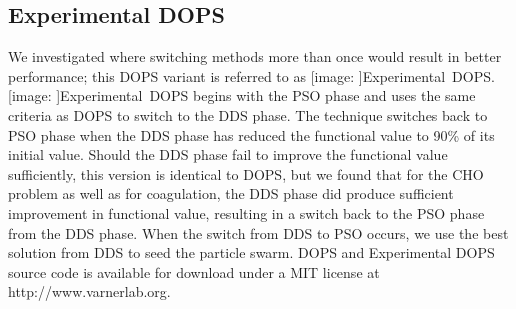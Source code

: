 \documentclass{bmcart}
\def\texttt{[image: ]}
\begin{document}
\subsection*{Experimental DOPS}
We investigated where switching methods more than once would result in better performance; this DOPS variant is referred to as \texttt{Experimental~DOPS}.
\texttt{Experimental~DOPS} begins with the PSO phase and uses the same criteria as DOPS to switch to the DDS phase. The technique switches back to PSO phase when the DDS phase has reduced the functional value to 90\% of its initial value.
Should the DDS phase fail to improve the functional value sufficiently, this version is identical to DOPS, but we found that for the CHO problem as well as for coagulation, the DDS phase did produce sufficient improvement in functional value, resulting in a switch back to the PSO phase from the DDS phase. When the switch from DDS to PSO occurs, we use the best solution from DDS to seed the particle swarm.
DOPS and Experimental DOPS source code is available for download under a MIT license at http://www.varnerlab.org.




\end{document}

